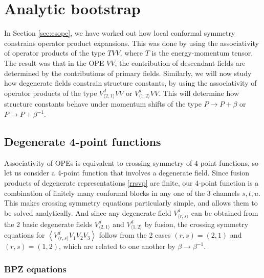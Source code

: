 \documentclass[12pt, a4paper]{article}
\theoremstyle{break}
\begin{document}
\section{Analytic bootstrap}\label{sec:ab}

In Section \ref{sec:csope}, we have worked out how local conformal symmetry constrains operator product expansions. This was done by using the associativity of operator products of the type $TVV$, where $T$ is the energy-momentum tensor. The result was that in the OPE $VV$, the contribution of descendant fields are determined by the contributions of primary fields. Similarly, we will now study how degenerate fields constrain structure constants, by using the associativity of 
operator products of the type $V^d_{\langle 2,1\rangle}VV$ or $V^d_{\langle 1,2\rangle}VV$.  
This will determine how structure constants behave under momentum shifts of the type $P\to P+ \beta$ or $P\to P+ \beta^{-1}$. 

\subsection{Degenerate 4-point functions}

Associativity of OPEs is equivalent to crossing symmetry of 4-point functions, so let us consider a 4-point function that involves a degenerate field. Since fusion products of degenerate representations \eqref{rrsvp} are finite, our 4-point function is a combination of finitely many conformal blocks in any one of the 3 channels $s,t,u$. This makes crossing symmetry equations particularly simple, and allows them to be solved analytically. 
And since any degenerate field $V^d_{\langle r,s\rangle}$ can be obtained from the 2 basic degenerate fields $V^d_{\langle 2,1\rangle}$ and $V^d_{\langle 1,2\rangle}$ by fusion, the crossing symmetry equations for $\left<V^d_{\langle r,s\rangle}V_1V_2V_3\right>$ follow from the 2 cases $(r,s)=(2,1)$ and $(r,s)=(1,2)$, which are related to one another by $\beta\to \beta^{-1}$.  

\subsubsection{BPZ equations}
\end{document}
